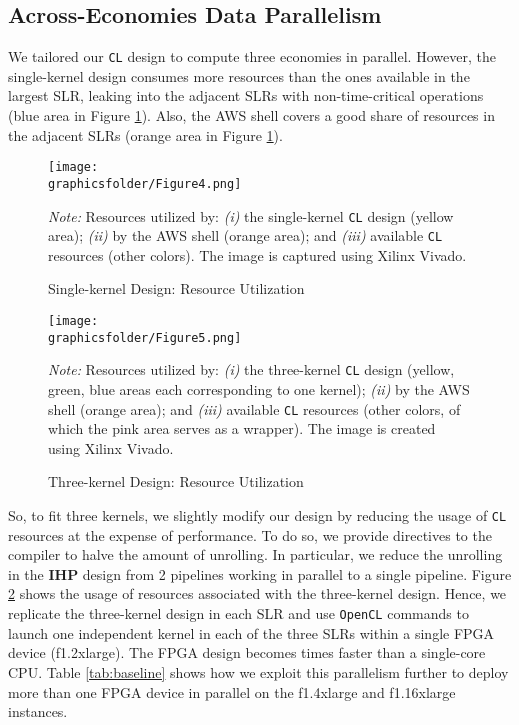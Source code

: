 \documentclass[12pt,american]{article}
\makeatletter
\newcommand{\resultsfolder}{./results}
\newcommand{\graphicsfolder}{./graphics}
\newcommand{\devfpgaI}{fpgaI}
\newcommand{\devcpu}{cpu-cores}
\newcommand{\nKMIkI}{nKM4-nk100}
\newcommand{\cpucoreI}{1}
\newcommand{\awsinstfI}{f1.2xlarge\@\xspace}
\newcommand{\awsinstfII}{f1.4xlarge\@\xspace}
\newcommand{\awsinstfIII}{f1.16xlarge\@\xspace}
\newcommand{\fpgaspeedICPUI}{}
\makeatother
\begin{document}
\subsection{Across-Economies Data Parallelism}\label{sec:par:acr}

We tailored our \texttt{CL} design to compute three economies in parallel. However, the single-kernel design consumes more resources than the ones available in the largest SLR, leaking into the adjacent SLRs with non-time-critical operations (blue area in Figure \ref{fig:singlekernel}).  Also, the AWS shell covers a good share of resources in the adjacent SLRs (orange area in Figure \ref{fig:singlekernel}). 

\begin{figure}[ht!]
\caption{Single-kernel Design: Resource Utilization}
\begin{center}
\texttt{[image: \\graphicsfolder/Figure4.png]}
\end{center}
\label{fig:singlekernel}
\small \textit{Note:} Resources utilized by: \textit{(i)} the single-kernel \texttt{CL} design (yellow area); \textit{(ii)} by the AWS shell (orange area); and \textit{(iii)} available \texttt{CL} resources (other colors). The image is captured using Xilinx Vivado.
\end{figure}

\begin{figure}[ht!]
\caption{Three-kernel Design: Resource Utilization}
\begin{center}
\texttt{[image: \\graphicsfolder/Figure5.png]}
\end{center}
\label{fig:threekernel}
\small \textit{Note:} Resources utilized by: \textit{(i)} the three-kernel \texttt{CL} design (yellow, green, blue areas each corresponding to one kernel); \textit{(ii)} by the AWS shell (orange area); and \textit{(iii)} available \texttt{CL} resources (other colors, of which the pink area serves as a wrapper). The image is created using Xilinx Vivado.
\end{figure}

So, to fit three kernels, we slightly modify our design by reducing the usage of \texttt{CL} resources at the expense of performance. To do so, we provide directives to the compiler to halve the amount of unrolling. In particular, we reduce the unrolling in the \textbf{IHP} design from 2 pipelines working in parallel to a single pipeline. Figure \ref{fig:threekernel} shows the usage of resources associated with the three-kernel design. Hence, we replicate the three-kernel design in each SLR and use \texttt{OpenCL} commands to launch one independent kernel in each of the three SLRs within a single FPGA device (\awsinstfI). The FPGA design becomes \fpgaspeedICPUI times faster than a single-core CPU. Table \ref{tab:baseline} shows how we exploit this parallelism further to deploy more than one FPGA device in parallel on the \awsinstfII and \awsinstfIII instances.
\end{document}
